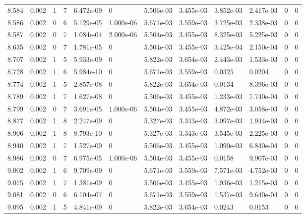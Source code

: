 \documentclass[preview]{standalone}
\begin{document}
{{{{{{{\begin{tabular}{L{1.2cm}C{1.2cm} C{0.3cm}C{0.5cm} C{1.4cm}C{1.4cm} C{1.4cm}C{1.4cm} C{1.6cm}C{1.6cm} C{1.6cm}C{1.6cm}}
  8.584  &  0.002  & 1     &  7 &  6.472e-09  & 0  &  5.506e-03&   3.455e-03& 3.852e-03 & 2.417e-03   &  0 & 0  \\ 
  8.586  &  0.002  & 0     &  6 &  5.129e-05  & 1.000e-06  &  5.671e-03&   3.559e-03& 3.725e-03 & 2.338e-03   &  0 & 0  \\ 
  8.587  &  0.002  & 0     &  7 &  1.084e-04  & 2.000e-06  &  5.504e-03&   3.455e-03& 8.325e-03 & 5.225e-03   &  0 & 0  \\ 
  8.635  &  0.002  & 0     &  7 &  1.781e-05  & 0  &  5.504e-03&   3.455e-03& 3.425e-04 & 2.150e-04   &  0 & 0  \\ 
  8.707  &  0.002  & 1     &  5 &  5.933e-09  & 0  &  5.822e-03&   3.654e-03& 2.443e-03 & 1.533e-03   &  0 & 0  \\ 
  8.728  &  0.002  & 1     &  6 &  5.984e-10  & 0  &  5.671e-03&   3.559e-03& 0.0325 & 0.0204   &  0 & 0  \\ 
  8.774  &  0.002  & 1     &  5 &  2.857e-08  & 0  &  5.822e-03&   3.654e-03& 0.0134 & 8.396e-03   &  0 & 0  \\ 
  8.789  &  0.002  & 1     &  7 &  1.627e-08  & 0  &  5.506e-03&   3.455e-03& 1.233e-03 & 7.740e-04   &  0 & 0  \\ 
  8.799  &  0.002  & 0     &  7 &  3.691e-05  & 1.000e-06  &  5.504e-03&   3.455e-03& 4.872e-03 & 3.058e-03   &  0 & 0  \\ 
  8.877  &  0.002  & 1     &  8 &  2.247e-09  & 0  &  5.327e-03&   3.343e-03& 3.097e-03 & 1.944e-03   &  0 & 0  \\ 
  8.906  &  0.002  & 1     &  8 &  8.793e-10  & 0  &  5.327e-03&   3.343e-03& 3.545e-03 & 2.225e-03   &  0 & 0  \\ 
  8.940  &  0.002  & 1     &  7 &  1.527e-09  & 0  &  5.506e-03&   3.455e-03& 1.090e-03 & 6.840e-04   &  0 & 0  \\ 
  8.986  &  0.002  & 0     &  7 &  6.975e-05  & 1.000e-06  &  5.504e-03&   3.455e-03& 0.0158 & 9.907e-03   &  0 & 0  \\ 
  9.002  &  0.002  & 1     &  6 &  9.709e-09  & 0  &  5.671e-03&   3.559e-03& 7.571e-03 & 4.752e-03   &  0 & 0  \\ 
  9.075  &  0.002  & 1     &  7 &  1.381e-09  & 0  &  5.506e-03&   3.455e-03& 1.936e-03 & 1.215e-03   &  0 & 0  \\ 
  9.081  &  0.002  & 0     &  6 &  6.104e-07  & 0  &  5.671e-03&   3.559e-03& 1.537e-03 & 9.640e-04   &  0 & 0  \\ 
  9.095  &  0.002  & 1     &  5 &  4.841e-09  & 0  &  5.822e-03&   3.654e-03& 0.0243 & 0.0153   &  0 & 0  \\ 

\end{tabular}}}}}}}}
\end{document}
